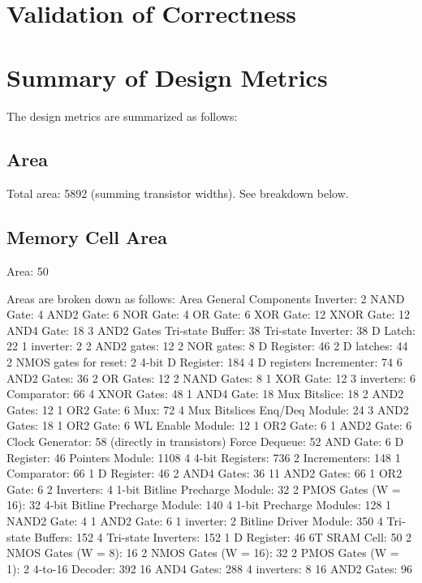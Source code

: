 \documentclass[12pt]{report}
\begin{document}
\newpage
\section*{Validation of Correctness}

\newpage
\section*{Summary of Design Metrics}
The design metrics are summarized as follows:
\subsection*{Area}
Total area: 5892 (summing transistor widths). See breakdown below.
\subsection*{Memory Cell Area}
Area: 50

Areas are broken down as follows:
Area
  General Components
    Inverter: 2
    NAND Gate: 4
    AND2 Gate: 6
    NOR Gate: 4
    OR Gate: 6
    XOR Gate: 12
    XNOR Gate: 12
    AND4 Gate: 18
      3 AND2 Gates
    Tri-state Buffer: 38
    Tri-state Inverter: 38
    D Latch: 22
      1 inverter: 2
      2 AND2 gates: 12
      2 NOR gates: 8
    D Register: 46
      2 D latches: 44
      2 NMOS gates for reset: 2
    4-bit D Register: 184
      4 D registers
    Incrementer: 74
      6 AND2 Gates: 36
      2 OR Gates: 12
      2 NAND Gates: 8
      1 XOR Gate: 12
      3 inverters: 6
    Comparator: 66
      4 XNOR Gates: 48
      1 AND4 Gate: 18
    Mux Bitslice: 18
      2 AND2 Gates: 12
      1 OR2 Gate: 6
    Mux: 72
      4 Mux Bitslices
    Enq/Deq Module: 24
      3 AND2 Gates: 18
      1 OR2 Gate: 6
    WL Enable Module: 12
      1 OR2 Gate: 6
      1 AND2 Gate: 6
    Clock Generator: 58
      (directly in transistors)
    Force Dequeue: 52
      AND Gate: 6
      D Register: 46
    Pointers Module: 1108
      4 4-bit Registers: 736
      2 Incrementers: 148
      1 Comparator: 66
      1 D Register: 46
      2 AND4 Gates: 36
      11 AND2 Gates: 66
      1 OR2 Gate: 6
      2 Inverters: 4
    1-bit Bitline Precharge Module: 32
      2 PMOS Gates (W = 16): 32
    4-bit Bitline Precharge Module: 140
      4 1-bit Precharge Modules: 128
      1 NAND2 Gate: 4
      1 AND2 Gate: 6
      1 inverter: 2
    Bitline Driver Module: 350
      4 Tri-state Buffers: 152
      4 Tri-state Inverters: 152
      1 D Register: 46
    6T SRAM Cell: 50
      2 NMOS Gates (W = 8): 16
      2 NMOS Gates (W = 16): 32
      2 PMOS Gates (W = 1): 2
    4-to-16 Decoder: 392
      16 AND4 Gates: 288
      4 inverters: 8
      16 AND2 Gates: 96
\end{document}
